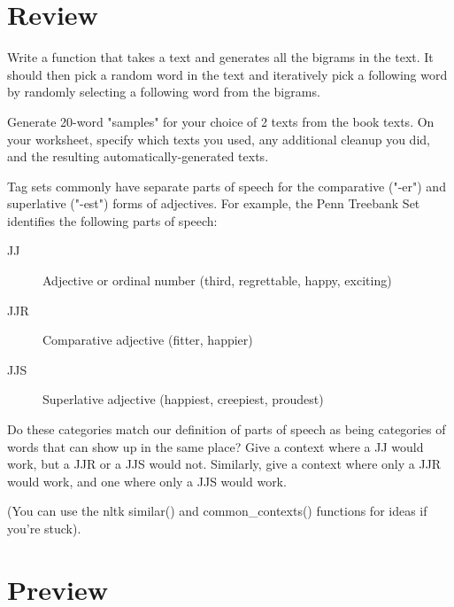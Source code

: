 \documentclass[11pt,letterpaper,boxed]{hmcpset}
\begin{document}
\section*{Review} 
\begin{problem}
Write a function that takes a text and generates all the bigrams in the text. It should then pick a random word in the text and iteratively
pick a following word by randomly selecting a following word from the bigrams.

Generate 20-word "samples" for your choice of 2 texts from the book texts. On your worksheet, specify which texts you used, any additional cleanup you did, and the resulting automatically-generated texts. 
\end{problem}

\begin{solution}
\vspace{6cm}
\end{solution}
 
\begin{problem}
Tag sets commonly have separate parts of speech for the comparative ("-er") and superlative ("-est") forms of adjectives. For example, the Penn Treebank Set identifies the following parts of speech: 
\begin{description}
    \item[JJ] Adjective or ordinal number (third, regrettable, happy, exciting)
    \item[JJR] Comparative adjective (fitter, happier)
    \item[JJS] Superlative adjective (happiest, creepiest, proudest)
\end{description}

Do these categories match our definition of parts of speech as being categories of words that can show up in the same place? Give a context where a JJ would work, but a JJR or a JJS would not. Similarly, give a context where only a JJR would work, and one where only a JJS would work.

(You can use the nltk similar() and common\_contexts() functions for ideas if you're stuck).
\end{problem}
\begin{solution}
\vspace{6cm}
\end{solution}

\pagebreak

\section*{Preview} 
\end{document}

